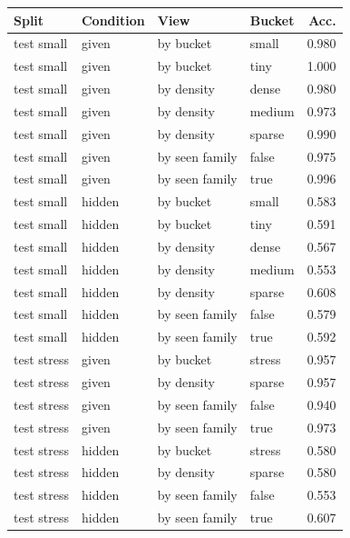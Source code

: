 \begin{tabular}{llllr}
\toprule
Split & Condition & View & Bucket & Acc. \\
\midrule
test small & given & by bucket & small & 0.980 \\
test small & given & by bucket & tiny & 1.000 \\
test small & given & by density & dense & 0.980 \\
test small & given & by density & medium & 0.973 \\
test small & given & by density & sparse & 0.990 \\
test small & given & by seen family & false & 0.975 \\
test small & given & by seen family & true & 0.996 \\
test small & hidden & by bucket & small & 0.583 \\
test small & hidden & by bucket & tiny & 0.591 \\
test small & hidden & by density & dense & 0.567 \\
test small & hidden & by density & medium & 0.553 \\
test small & hidden & by density & sparse & 0.608 \\
test small & hidden & by seen family & false & 0.579 \\
test small & hidden & by seen family & true & 0.592 \\
test stress & given & by bucket & stress & 0.957 \\
test stress & given & by density & sparse & 0.957 \\
test stress & given & by seen family & false & 0.940 \\
test stress & given & by seen family & true & 0.973 \\
test stress & hidden & by bucket & stress & 0.580 \\
test stress & hidden & by density & sparse & 0.580 \\
test stress & hidden & by seen family & false & 0.553 \\
test stress & hidden & by seen family & true & 0.607 \\
\bottomrule
\end{tabular}
